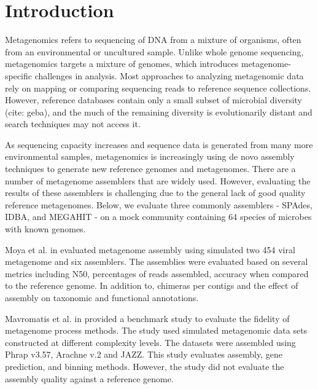 \documentclass[10pt,a4paper,twocolumn]{article}
\begin{document}
\clearpage

\section*{Introduction}

Metagenomics refers to sequencing of DNA from a mixture of organisms,
often from an environmental or uncultured sample. Unlike whole genome
sequencing, metagenomics targets a mixture of genomes, which
introduces metagenome-specific challenges in analysis.  Most
approaches to analyzing metagenomic data rely on mapping or comparing
sequencing reads to reference sequence collections. However, reference
databases contain only a small subset of microbial diversity (cite:
geba), and the much of the remaining diversity is evolutionarily distant
and search techniques may not access it.

As sequencing capacity increases and sequence data is generated from
many more environmental samples, metagenomics is increasingly using de
novo assembly techniques to generate new reference genomes and
metagenomes.  There are a number of metagenome assemblers that are
widely used. However, evaluating the results of these assemblers is
challenging due to the general lack of good quality reference
metagenomes.  Below, we evaluate three commonly assemblers - SPAdes,
IDBA, and MEGAHIT - on a mock community containing 64 species of
microbes with known genomes.


 

 
Moya et al. in \cite{moya2014} evaluated metagenome assembly using
simulated two 454 viral metagenome and six assemblers. The assemblies
were evaluated based on several metrics including N50, percentages of
reads assembled, accuracy when compared to the reference genome. In
addition to, chimeras per contigs and the effect of assembly on
taxonomic and functional annotations.
 
Mavromatis et al. in \cite{mavromatis2007} provided a benchmark study
to evaluate the fidelity of metagenome process methods. The study used
simulated metagenomic data sets constructed at different complexity
levels.
The datasets were assembled using Phrap v3.57, Arachne v.2
\cite{arachne} and JAZZ. \cite{jazz}
This study evaluates assembly, gene prediction, and binning
methods. However, the study did not evaluate the assembly quality
against a reference genome.
\end{document}
